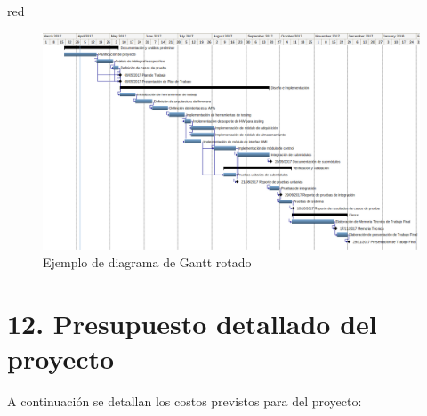 \documentclass[
11pt, %
]{charter}
\begin{document}
\begin{consigna}{red}
\begin{landscape}
\begin{figure}[htpb]
\centering 
\includegraphics[height=.85\textheight]{./Figuras/Gantt-2.png}
\caption{Ejemplo de diagrama de Gantt rotado}
\label{fig:diagGantt}
\end{figure}

\end{landscape}

\end{consigna}


\section{12. Presupuesto detallado del proyecto}
\label{sec:presupuesto}

A continuación se detallan los costos previstos para del proyecto:
\end{document}
